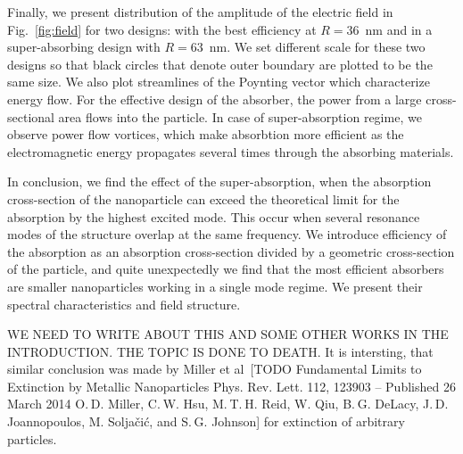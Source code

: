 \documentclass[aps,prl,twocolumn,showpacs,superscriptaddress,groupedaddress]{revtex4-1}
\begin{document}
\begin{figure}
\end{figure}
%
Finally, we present distribution of the amplitude of the electric
field in Fig.~\ref{fig:field} for two designs: with the best
efficiency at $R=36$~nm and in a super-absorbing design with
$R=63$~nm.  We set different scale for these two designs so that black
circles that denote outer boundary are plotted to be the same size.
We also plot streamlines of the Poynting vector which characterize
energy flow. For the effective design of the absorber, the power from
a large cross-sectional area flows into the particle.  In case of
super-absorption regime, we observe power flow vortices, which make
absorbtion more efficient as the electromagnetic energy propagates
several times through the absorbing materials.


In conclusion, we find the effect of the super-absorption, when the
absorption cross-section of the nanoparticle can exceed the
theoretical limit for the absorption by the highest excited mode. This
occur when several resonance modes of the structure overlap at the
same frequency. We introduce efficiency of the absorption as an
absorption cross-section divided by a geometric cross-section of the
particle, and quite unexpectedly we find that the most efficient
absorbers are smaller nanoparticles working in a single mode
regime. We present their spectral characteristics and field structure.


WE NEED TO WRITE ABOUT THIS AND SOME OTHER WORKS IN THE
INTRODUCTION. THE TOPIC IS DONE TO DEATH. It is intersting, that
similar conclusion was made by Miller et al~[TODO Fundamental Limits
to Extinction by Metallic Nanoparticles Phys. Rev. Lett. 112, 123903 –
Published 26 March 2014 O. D. Miller, C. W. Hsu, M. T. H. Reid,
W. Qiu, B. G. DeLacy, J. D. Joannopoulos, M. Soljačić, and
S. G. Johnson] for extinction of arbitrary particles.



\end{document}
